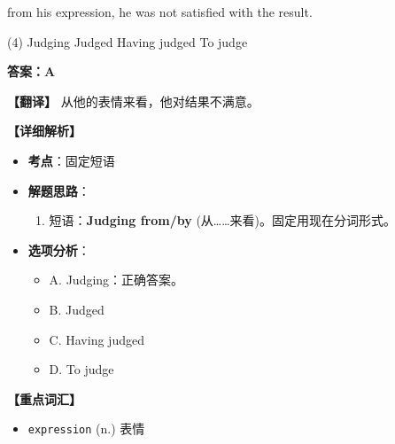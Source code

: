 \documentclass[11pt, a4paper]{article}
\newcommand{\analysis}[4]{
    \begin{solutionbox}
        \textbf{答案：#1}
        
        \textbf{【翻译】} #2
        
        \textbf{【详细解析】}
        #3
        
        \textbf{【重点词汇】}
        #4
    \end{solutionbox}
}
\newcommand{\blank}{\underline{\hspace{1.5cm}}}
\begin{document}
\begin{questions}
    \item \blank from his expression, he was not satisfied with the result.
    \begin{tasks}(4)
        \task Judging \task Judged \task Having judged \task To judge
    \end{tasks}
    \analysis{A}{从他的表情来看，他对结果不满意。}{
        \begin{itemize}
            \item \textbf{考点}：固定短语
            \item \textbf{解题思路}：
                \begin{enumerate}
                    \item 短语：\textbf{Judging from/by} (从……来看)。固定用现在分词形式。
                \end{enumerate}
            \item \textbf{选项分析}：
                \begin{itemize}
                    \item A. Judging：正确答案。
                    \item B. Judged
                    \item C. Having judged
                    \item D. To judge
                \end{itemize}
        \end{itemize}
    }{
        \begin{itemize}
            \item \texttt{expression} (n.) 表情
        \end{itemize}
    }


\end{questions}
\end{document}
